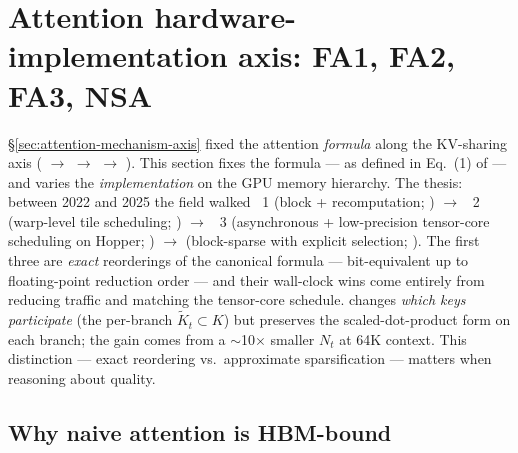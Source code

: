 
\section{Attention hardware-implementation axis: FA1, FA2, FA3, NSA}
\label{sec:attention-hardware-axis}
\label{sec:hardware-attention}

\S\ref{sec:attention-mechanism-axis} fixed the attention \emph{formula}
along the KV-sharing axis ( $\to$  $\to$  $\to$ ). This
section fixes the formula ---  as defined
in Eq.~(1) of \citet{vaswani2017} --- and varies the
\emph{implementation} on the GPU memory hierarchy. The thesis: between
2022 and 2025 the field walked ~1 (block  +
recomputation; \citealp{dao2022}) $\to$ ~2 (warp-level
tile scheduling; \citealp{dao2023}) $\to$ ~3
(asynchronous + low-precision tensor-core scheduling on Hopper;
\citealp{shah2024}) $\to$  (block-sparse with
explicit selection; \citealp{yuan2025}). The first three are
\emph{exact} reorderings of the canonical formula --- bit-equivalent up
to floating-point reduction order --- and their wall-clock wins come
entirely from reducing  traffic and matching the tensor-core
schedule.  changes \emph{which keys participate} (the per-branch
$\tilde K_t \subset K$) but preserves the scaled-dot-product form on
each branch; the gain comes from a $\sim$10$\times$ smaller $N_t$ at
64K context. This distinction --- exact reordering vs.\ approximate
sparsification --- matters when reasoning about quality.

\subsection{Why naive attention is HBM-bound}
\label{sec:fa-roofline}

